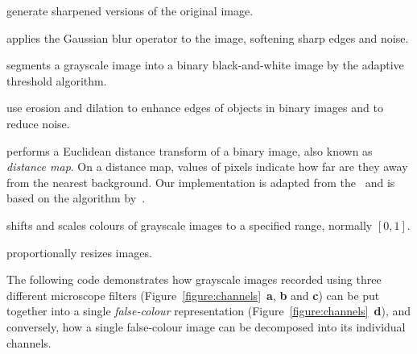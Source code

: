 \begin{description}
    \setlength{\itemsep}{0in}
    \item[sharpen, unsharpMask] generate sharpened versions of the original image. 
    \item[gaussFilter] applies the Gaussian blur operator to the image, softening sharp edges and noise.
    \item[thresh] segments a grayscale image into a binary black-and-white image by the adaptive threshold algorithm.
    \item[mOpen, mClose] use erosion and dilation to enhance edges of objects in binary images and to reduce noise.
    \item[distMap] performs a Euclidean distance transform of a binary image, also known as {\em distance map}. On a distance map, values of pixels indicate how far are they away from the nearest background. Our implementation is adapted from the~ and is based on the algorithm by~\cite{R:Lotufo+Zampirolli:2001}.
    \item[normalize] shifts and scales colours of grayscale images to a specified range, normally $[0,1]$.
    \item[sample.image] proportionally resizes images.
\end{description}

The following code demonstrates how grayscale images recorded using three different microscope filters (Figure~\ref{figure:channels}~{\bf a}, {\bf b} and {\bf c}) can be put together into a single {\em false-colour} representation (Figure~\ref{figure:channels}~{\bf d}), and conversely, how a single false-colour image can be decomposed into its individual channels.

